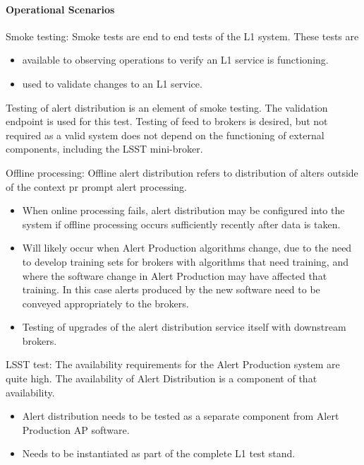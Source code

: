 \paragraph{Operational Scenarios}

Smoke testing:  Smoke tests are end to end tests of the L1 system. These tests are

\begin{itemize}

\item available to observing operations to verify an L1 service is functioning.

\item used to validate changes to an L1 service.

\end{itemize}

Testing of alert distribution is an element of smoke testing. The validation endpoint is used for this test.  Testing of feed to brokers is desired, but not required as a valid system does not depend on the functioning of external components, including the LSST mini-broker.  

Offline processing:  Offline alert distribution refers to distribution of alters outside of the context pr prompt alert processing.

\begin{itemize}

\item When online processing fails, alert distribution may be configured into the system if offline processing occurs sufficiently recently after data is taken. 

\item Will likely occur when Alert Production algorithms change, due to the need to develop training sets for brokers with algorithms that need training, and where the software change in Alert Production may have affected that training. In this case alerts produced by the new software need to be conveyed appropriately to the brokers. 

\item Testing of upgrades of the alert distribution service itself with downstream brokers. 

\end{itemize}

LSST test: The availability requirements for the Alert Production system are quite high. The availability of Alert Distribution is a component of that availability.   

\begin{itemize}

\item Alert distribution needs to be tested as a separate component from Alert Production AP software.

\item Needs to be instantiated as part of the complete L1 test stand. 

\end{itemize}

